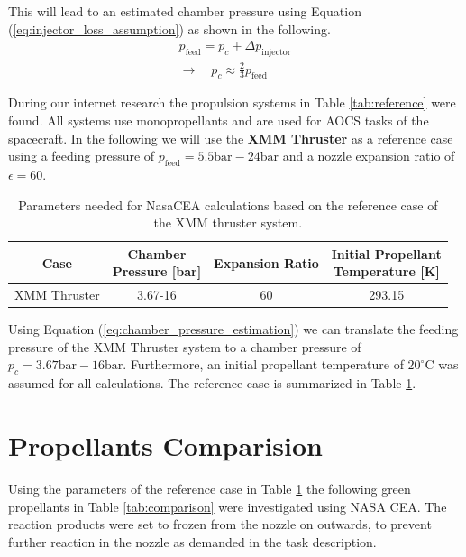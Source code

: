 \documentclass[12pt]{article}
\begin{document}
This will lead to an estimated chamber pressure using Equation (\ref{eq:injector_loss_assumption}) as shown in the following.
\begin{gather}
	p_{\text{feed}} = p_c + \Delta p_{\text{injector}} \\
	\rightarrow \quad p_c \approx \frac{2}{3} p_{\text{feed}}
	\label{eq:chamber_pressure_estimation}
\end{gather}

During our internet research the propulsion systems in Table \ref{tab:reference} were found. All systems use monopropellants and are used for AOCS tasks of the spacecraft. In the following we will use the \textbf{XMM Thruster} as a reference case using a feeding pressure of $p_{\text{feed}}=5.5\text{bar}-24\text{bar}$ and a nozzle expansion ratio of $\epsilon=60$.\\

\begin{table}[h!]
	\centering
	\begin{tabular}{|c|c|c|c|}
		\hline
		Case & \makecell{Chamber\\ Pressure {[}bar{]}} & Expansion Ratio & \makecell{Initial Propellant\\ Temperature {[}K{]}} \\ \hline
		XMM Thruster                      &        3.67-16         &  60   &              293.15                      \\ \hline
	\end{tabular}
	\caption{Parameters needed for NasaCEA calculations based on the reference case of the XMM thruster system.}
	\label{tab:selected_reference_case}
\end{table}

Using Equation (\ref{eq:chamber_pressure_estimation}) we can translate the feeding pressure of the XMM Thruster system to a chamber pressure of $p_{c}=3.67\text{bar}-16\text{bar}$. Furthermore, an initial propellant temperature of $20^\circ\text{C}$ was assumed for all calculations. The reference case is summarized in Table \ref{tab:selected_reference_case}.
 
\section{Propellants Comparision}
Using the parameters of the reference case in Table \ref{tab:selected_reference_case} the following green propellants in Table \ref{tab:comparison} were investigated using NASA CEA. The reaction products were set to frozen from the nozzle on outwards, to prevent further reaction in the nozzle as demanded in the task description.
\end{document}
